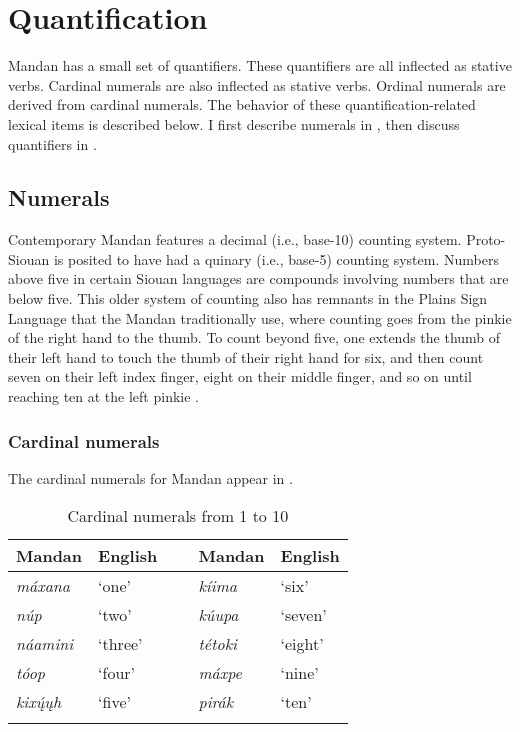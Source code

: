 \section{Quantification}\label{SecQuantifiers}

Mandan has a small set of quantifiers. These quantifiers are all inflected as stative verbs. Cardinal numerals are also inflected as stative verbs. Ordinal numerals are derived from cardinal numerals. The behavior of these quantification-related lexical items is described below. I first describe numerals in , then discuss quantifiers in .

\subsection{Numerals}\label{SubSecNumerals}

Contemporary Mandan features a decimal (i.e., base-10) counting system. Proto-Siouan is posited to have had a quinary (i.e., base-5) counting system. Numbers above five in certain Siouan languages are compounds involving numbers that are below five. This older system of counting also has remnants in the Plains Sign Language that the Mandan traditionally use, where counting goes from the pinkie of the right hand to the thumb. To count beyond five, one extends the thumb of their left hand to touch the thumb of their right hand for six, and then count seven on their left index finger, eight on their middle finger, and so on until reaching ten at the left pinkie \citep[22]{tomkins1926}.

\subsubsection{Cardinal numerals}\label{SubSubSecCardinal}

The cardinal numerals for Mandan appear in .

\begin{table}
        \caption{Cardinal numerals from 1 to 10}\label{Tab1to10}
    \begin{tabular}{lllll}
\lsptoprule
    \textbf{Mandan}&\textbf{English}& ~&  \textbf{Mandan}&\textbf{English}\\
\midrule
    \textit{máxana}&`one'&~&  \textit{kíima}&`six'\\
    \textit{núp}&`two'&~&     \textit{kúupa}&`seven'\\
    \textit{náamini}&`three'&~&   \textit{tétoki}&`eight'\\
    \textit{tóop}&`four'&~&   \textit{máxpe}&`nine'\\
    \textit{kixų́ųh}&`five'&~&\textit{pirák}&`ten'\\\lspbottomrule
    \end{tabular}

\end{table}

